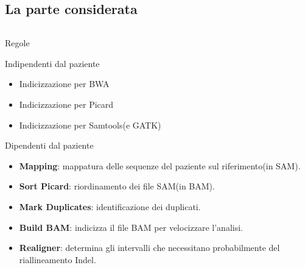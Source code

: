 \documentclass{beamer}
\begin{document}
\subsection{La parte considerata}
\begin{frame}
\begin{columns}
\begin{column}{0.8\linewidth}
\begin{block}{Regole}
\begin{block}{Indipendenti dal paziente}
\begin{itemize}
\small
\item Indicizzazione per BWA
\item Indicizzazione per Picard
\item Indicizzazione per Samtools(e GATK) 
\end{itemize}
\begin{block}{Dipendenti dal paziente}
\small
\begin{itemize}
\small
\item \textbf{Mapping}: mappatura delle sequenze del paziente sul riferimento(in SAM).
\item \textbf{Sort Picard}: riordinamento dei file SAM(in BAM). 
\item \textbf{Mark Duplicates}: identificazione dei duplicati.
\item \textbf{Build BAM}: indicizza il file BAM per velocizzare l'analisi.
\item \textbf{Realigner}: determina gli intervalli che necessitano probabilmente del riallineamento Indel.
\end{itemize}
\end{block}
\end{block}
\end{block}
\end{column}
\end{columns}
\end{frame}
\end{document}
